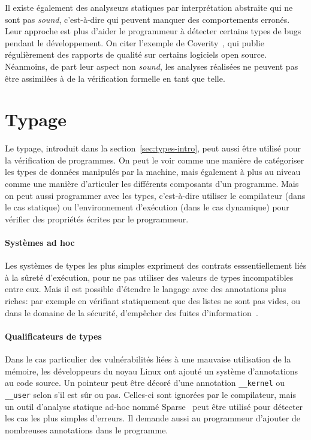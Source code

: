 Il existe également des analyseurs statiques par interprétation abstraite qui ne
sont pas \emph{sound}, c'est-à-dire qui peuvent manquer des comportements
erronés. Leur approche est plus d'aider le programmeur à détecter certains types
de bugs pendant le développement. On citer l'exemple de
Coverity~\cite{coverityBillion}, qui publie régulièrement des rapports de
qualité sur certains logiciels open source. Néanmoins, de part leur aspect non
\emph{sound}, les analyses réalisées ne peuvent pas être assimilées à de la
vérification formelle en tant que telle.

\section{Typage}

Le typage, introduit dans la section~\ref{sec:types-intro}, peut aussi être
utilisé pour la vérification de programmes. On peut le voir comme une manière de
catégoriser les types de données manipulés par la machine, mais également à plus
au niveau comme une manière d'articuler les différents composants d'un
programme. Mais on peut aussi programmer avec les types, c'est-à-dire utiliser
le compilateur (dans le cas statique) ou l'environnement d'exécution (dans le
cas dynamique) pour vérifier des propriétés écrites par le programmeur.

\paragraph{Systèmes ad hoc}

Les systèmes de types les plus simples expriment des contrats esssentiellement
liés à la sûreté d'exécution, pour ne pas utiliser des valeurs de types
incompatibles entre eux. Mais il est possible d'étendre le langage avec des
annotations plus riches: par exemple en vérifiant statiquement que des listes
ne sont pas vides\cite{lightweight-static-capabilities}, ou dans le domaine de
la sécurité, d'empêcher des fuites d'information~\cite{LZ06a}.

\paragraph{Qualificateurs de types}

Dans le cas particulier des vulnérabilités liées à une mauvaise utilisation de
la mémoire, les développeurs du noyau Linux ont ajouté un système d'annotations
au code source. Un pointeur peut être décoré d'une annotation
\texttt{\_\_kernel} ou \texttt{\_\_user} selon s'il est sûr ou pas. Celles-ci
sont ignorées par le compilateur, mais un outil d'analyse statique ad-hoc nommé
Sparse~ peut être utilisé pour détecter les cas les plus simples
d'erreurs. Il demande aussi au programmeur d'ajouter de nombreuses annotations
dans le programme.

